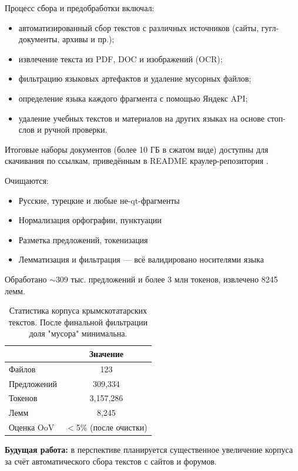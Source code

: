 \documentclass{article}
\begin{document}
Процесс сбора и предобработки включал:
\begin{itemize}
    \item автоматизированный сбор текстов с различных источников (сайты, гугл-документы, архивы и пр.);
    \item извлечение текста из PDF, DOC и изображений (OCR);
    \item фильтрацию языковых артефактов и удаление мусорных файлов;
    \item определение языка каждого фрагмента с помощью Яндекс API;
    \item удаление учебных текстов и материалов на других языках на основе стоп-слов и ручной проверки.
\end{itemize}

Итоговые наборы документов (более 10 ГБ в сжатом виде) доступны для скачивания по ссылкам, приведённым в README краулер-репозитория \cite{qirimtatar_crawlers}.

Очищаются:
\begin{itemize}
    \item Русские, турецкие и любые не-qt-фрагменты
    \item Нормализация орфографии, пунктуации
    \item Разметка предложений, токенизация
    \item Лемматизация и фильтрация — всё валидировано носителями языка
\end{itemize}

Обработано $\sim$309 тыс. предложений и более 3 млн токенов, извлечено 8245 лемм.

\begin{table}[tbh!]
\begin{center}
\begin{tabular}[t]{|l|c|}
\hline
 & Значение \\
\hline
Файлов & 123  \\
Предложений & 309,334 \\
Токенов & 3,157,286 \\
Лемм & 8,245 \\
Оценка OoV & $<$5\% (после очистки) \\
\hline
\end{tabular}
\caption{Статистика корпуса крымскотатарских текстов. После финальной фильтрации доля "{}мусора"{} минимальна.}
\label{tab:statistics}
\end{center}
\end{table}

\textbf{Будущая работа:} в перспективе планируется существенное увеличение корпуса за счёт автоматического сбора текстов с сайтов и форумов.
\end{document}
